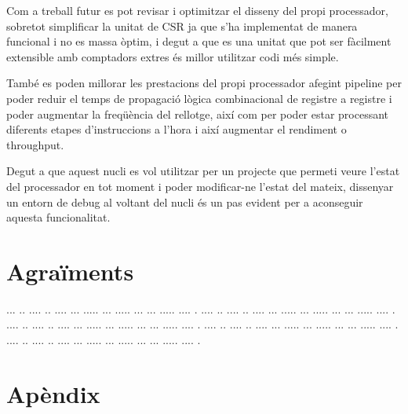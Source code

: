\documentclass[10pt,a4paper,twocolumn,twoside]{article}
\begin{document}
Com a treball futur es pot revisar i optimitzar el disseny del propi processador, sobretot simplificar la unitat de CSR ja que s'ha implementat de manera funcional i no es massa òptim, i degut a que es una unitat que pot ser fàcilment extensible amb comptadors extres és millor utilitzar codi més simple.

També es poden millorar les prestacions del propi processador afegint pipeline per poder reduir el temps de propagació lògica combinacional de registre a registre i poder augmentar la freqüència del rellotge, així com per poder estar processant diferents etapes d'instruccions a l'hora i així augmentar el rendiment o throughput.

Degut a que aquest nucli es vol utilitzar per un projecte que permeti veure l'estat del processador en tot moment i poder modificar-ne l'estat del mateix, dissenyar un entorn de debug al voltant del nucli és un pas evident per a aconseguir aquesta funcionalitat.
    
    



\section*{Agraïments}

... ..  .... .. .... ... ..... ... ..... ... ... ..... .... .
.... ..  .... .. .... ... ..... ... ..... ... ... ..... .... .
.... ..  .... .. .... ... ..... ... ..... ... ... ..... .... .
.... ..  .... .. .... ... ..... ... ..... ... ... ..... .... .
.... ..  .... .. .... ... ..... ... ..... ... ... ..... .... .










\appendix

\section*{Apèndix}

\setcounter{section}{1}
\end{document}
